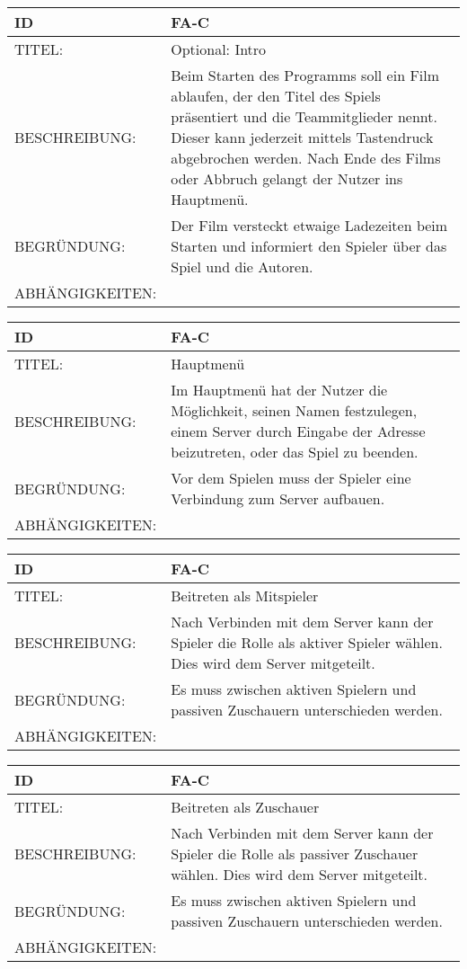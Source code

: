 \begin{tabularx}{16cm}{l|X}
\textbf{ID} & \textbf{FA-C} \\
\hline
TITEL: & Optional: Intro \\
\hline 
BESCHREIBUNG: & Beim Starten des Programms soll ein Film ablaufen, der den Titel des Spiels präsentiert und die Teammitglieder nennt. Dieser kann jederzeit mittels Tastendruck abgebrochen werden. Nach Ende des Films oder Abbruch gelangt der Nutzer ins Hauptmenü. \\
\hline
BEGRÜNDUNG: & Der Film versteckt etwaige Ladezeiten beim Starten und informiert den Spieler über das Spiel und die Autoren.\\
\hline
ABHÄNGIGKEITEN: & \\
\end{tabularx}

\begin{tabularx}{16cm}{l|X}
\textbf{ID} & \textbf{FA-C} \\
\hline
TITEL: & Hauptmenü \\
\hline 
BESCHREIBUNG: & Im Hauptmenü hat der Nutzer die Möglichkeit, seinen Namen festzulegen, einem Server durch Eingabe der Adresse beizutreten, oder das Spiel zu beenden.\\ 
\hline
BEGRÜNDUNG: & Vor dem Spielen muss der Spieler eine Verbindung zum Server aufbauen. \\
\hline
ABHÄNGIGKEITEN: & \\
\end{tabularx}

\begin{tabularx}{16cm}{l|X}
\textbf{ID} & \textbf{FA-C} \\
\hline
TITEL: & Beitreten als Mitspieler \\
\hline 
BESCHREIBUNG: & Nach Verbinden mit dem Server kann der Spieler die Rolle als aktiver Spieler wählen. Dies wird dem Server mitgeteilt. \\
\hline
BEGRÜNDUNG: & Es muss zwischen aktiven Spielern und passiven Zuschauern unterschieden werden. \\
\hline
ABHÄNGIGKEITEN: & \\
\end{tabularx}

\begin{tabularx}{16cm}{l|X}
\textbf{ID} & \textbf{FA-C} \\
\hline
TITEL: & Beitreten als Zuschauer \\
\hline 
BESCHREIBUNG: & Nach Verbinden mit dem Server kann der Spieler die Rolle als passiver Zuschauer wählen. Dies wird dem Server mitgeteilt. \\
\hline
BEGRÜNDUNG: & Es muss zwischen aktiven Spielern und passiven Zuschauern unterschieden werden. \\
\hline
ABHÄNGIGKEITEN: & \\
\end{tabularx}

